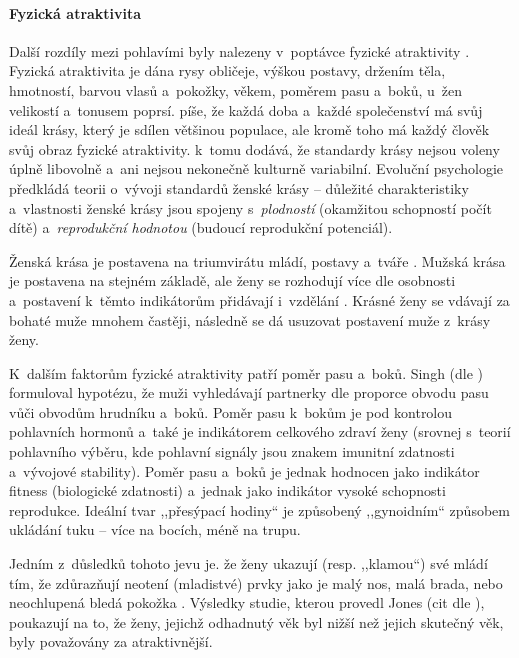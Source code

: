 \documentclass[a4paper, 12pt, notitlepage, oneside, numbers=noenddot]{report}
\begin{document}
\paragraph{Fyzická atraktivita}

Další rozdíly mezi pohlavími byly nalezeny v~poptávce fyzické
atraktivity \citep{Buss2007}.  Fyzická atraktivita je dána rysy
obličeje, výškou postavy, držením těla, hmotností, barvou vlasů
a~pokožky, věkem, poměrem pasu a~boků, u~žen velikostí a~tonusem
poprsí.  \citep{Slamenik2008} píše, že každá doba a~každé společenství
má svůj ideál krásy, který je sdílen většinou populace, ale kromě toho
má každý člověk svůj obraz fyzické atraktivity.  \citet{Buss2007}
k~tomu dodává, že standardy krásy nejsou voleny úplně libovolně a~ani
nejsou nekonečně kulturně variabilní.  Evoluční psychologie předkládá
teorii o~vývoji standardů ženské krásy -- důležité charakteristiky
a~vlastnosti ženské krásy jsou spojeny s~\emph{plodností} (okamžitou
schopností počít dítě) a~\emph{reprodukční hodnotou} (budoucí
reprodukční potenciál).

Ženská krása je postavena na triumvirátu mládí, postavy a~tváře
\citep{Ridley2007, BussSchmitt1993}.  Mužská krása je postavena na
stejném základě, ale ženy se rozhodují více dle osobnosti a~postavení
k~těmto indikátorům přidávají i~vzdělání \citep{Ridley2007,
  BussSchmitt1993, Buss2007}.  Krásné ženy se vdávají za bohaté muže
mnohem častěji, následně se dá usuzovat postavení muže z~krásy ženy.

K~dalším faktorům fyzické atraktivity patří poměr pasu a~boků.  Singh
(dle \citealp{BarrettDunbarLycett2007, Ridley2007}) formuloval
hypotézu, že muži vyhledávají partnerky dle proporce obvodu pasu vůči
obvodům hrudníku a~boků.  Poměr pasu k~bokům je pod kontrolou
pohlavních hormonů a~také je indikátorem celkového zdraví ženy
(srovnej s~teorií pohlavního výběru, kde pohlavní signály jsou znakem
imunitní zdatnosti a~vývojové stability). Poměr pasu a~boků je jednak
hodnocen jako indikátor fitness (biologické zdatnosti) a~jednak jako
indikátor vysoké schopnosti reprodukce.  Ideální tvar ,,přesýpací
hodiny`` je způsobený ,,gynoidním`` způsobem ukládání tuku -- více na
bocích, méně na trupu.

Jedním z~důsledků tohoto jevu je. že ženy ukazují (resp. ,,klamou``)
své mládí tím, že zdůrazňují neotení (mladistvé) prvky jako je malý
nos, malá brada, nebo neochlupená bledá pokožka \citep{Barber1995}.
Výsledky studie, kterou provedl Jones (cit dle
\citealp{BarrettDunbarLycett2007}), poukazují na to, že ženy, jejichž
odhadnutý věk byl nižší než jejich skutečný věk, byly považovány za
atraktivnější.
\end{document}
